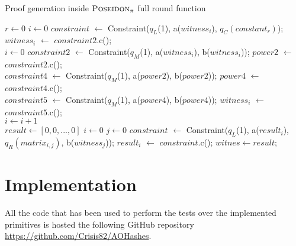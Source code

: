 \documentclass[12pt, a4paper]{report}
\begin{document}
\begin{algorithm}[H]
  \caption{Proof generation inside $\textsc{Poseidon}_\pi$ full round function}\label{alg:permexample}
  \begin{algorithmic}
    \State $r \gets 0$
     
      \State $i \gets 0$
       
          \State $constraint$ $\gets$ Constraint($q_L$(1), a($witness_i$), $q_C(constant_r)$);
          \State $witness_i$ $\gets$ $constraint2$.c(); 
      \EndWhile
      \\
      \State $i \gets 0$
       
          \State $constraint2$ $\gets$ Constraint($q_M$(1), a($witness_i$), b($witness_i$));
          \State $power2$ $\gets$ $constraint2$.c();
          \\
          \State $constraint4$ $\gets$ Constraint($q_M$(1), a($power2$), b($power2$));
          \State $power4$ $\gets$ $constraint4$.c();
          \\
          \State $constraint5$ $\gets$ Constraint($q_M$(1), a($power4$), b($power4$));
          \State $witness_i$ $\gets$ $constraint5$.c();
          \\
          \State $i \gets i+1$
      \EndWhile
      \\
      \State $result \gets [0, 0, ..., 0]$ 
      \State $i \gets 0$
       
        \State $j \gets 0$
          \State $constraint$ $\gets$ Constraint($q_L$(1), a($result_i$), $q_R(matrix_{i,j})$, b($witness_j$));
          \State $result_i$ $\gets$ $constraint$.c();
        \EndWhile
      \EndWhile
      \State $witnes \gets result$;
    \EndWhile
  \end{algorithmic}
\end{algorithm}

\section{Implementation}\label{sec:implementation}

All the code that has been used to perform the tests over the implemented primitives is hosted the following GitHub repository \url{https://github.com/Crisis82/AOHashes}.
\end{document}
